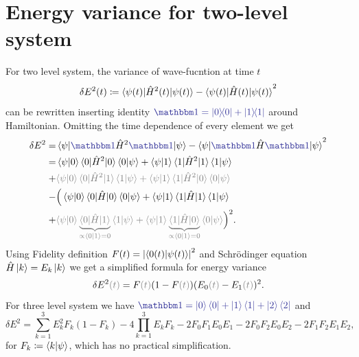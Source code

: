 \section{Energy variance for two-level system}
For two level system, the variance of wave-fucntion at time $t$
\begin{equation}
    \delta E^2(t)\coloneqq \braket{\psi(t)|\hat{H}^2(t)|\psi(t)}-\braket{\psi(t)|\hat{H}(t)|\psi(t)}^2
\end{equation}
can be rewritten inserting identity $\bluee{\Id=\ket{0}\!\!\bra{0}+\ket{1}\!\!\bra{1}}$ around Hamiltonian. Omitting the time dependence of every element we get
\begin{equation}
    \begin{split}
        \delta E^2 =& \braket{\psi|\bluee{\Id}\HH^2\bluee{\Id}|\psi}-\braket{\psi|\bluee{\Id}\HH\bluee{\Id}|\psi}^2\\
        =&\braket{\psi|0}\braket{0|\HH^2|0}\braket{0|\psi}+\braket{\psi|1}\braket{1|\HH^2|1}\braket{1|\psi}\\
        +&\textcolor{gray}{\braket{\psi|0}\braket{0|\HH^2|1}\braket{1|\psi}+\braket{\psi|1}\braket{1|\HH^2|0}\braket{0|\psi}}\\
        -&\Big(\braket{\psi|0}\braket{0|\HH|0}\braket{0|\psi}+\braket{\psi|1}\braket{1|\HH|1}\braket{1|\psi}\\
        +&\textcolor{gray}{\braket{\psi|0}\underbrace{\braket{0|\HH|1}}_{\propto \braket{0|1}=0}\braket{1|\psi}+\braket{\psi|1}\underbrace{\braket{1|\HH|0}}_{\propto \braket{0|1}=0}\braket{0|\psi}}\Big)^2.
    \end{split}
\end{equation}
Using Fidelity definition $F(t)=\left|\braket{0(t)|\psi(t)}\right|^2$ and Schr\"odinger equation $\hat{H}\ket{k}=E_k\ket{k}$ we get a simplified formula for energy variance
\begin{equation}
    \delta E^2\gray{(t)} = F\gray{(t)}(1-F\gray{(t)})(E_0\gray{(t)}-E_1\gray{(t)})^2.
\end{equation}
For three level system we have $\bluee{\Id=\ket{0}\bra{0}+\ket{1}\bra{1}+\ket{2}\bra{2}}$ and
\begin{equation}
    \delta E^2=\sum_{k=1}^3 E_k^2 F_k(1-F_k)-4\prod_{k=1}^3 E_kF_k-2F_0F_1E_0E_1-2F_0F_2E_0E_2-2F_1F_2E_1E_2,
\end{equation}
for $F_k\coloneqq \braket{k|\psi}$, which has no practical simplification.











